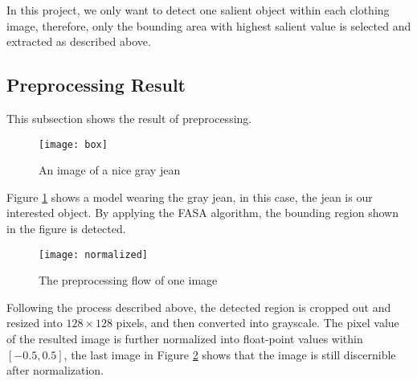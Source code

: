 In this project, we only want to detect one salient object within each clothing image, therefore, only the bounding area with highest salient value is selected and extracted as described above.

\subsection{Preprocessing Result}
This subsection shows the result of preprocessing.
\begin{figure}[h]
  \centering
  \texttt{[image: box]}
  \caption{An image of a nice gray jean}
  \label{fig:sample_image}
\end{figure}

Figure \ref{fig:sample_image} shows a model wearing the gray jean, in this case, the jean is our interested object. By applying the FASA algorithm, the bounding region shown in the figure is detected.

\begin{figure}[h]
  \centering
  \texttt{[image: normalized]}
  \caption{The preprocessing flow of one image}
  \label{fig:normalized}
\end{figure}

Following the process described above, the detected region is cropped out and resized into $128 \times 128$ pixels, and then converted into grayscale. The pixel value of the resulted image is further normalized into float-point values within $[-0.5, 0.5]$, the last image in Figure \ref{fig:normalized} shows that the image is still discernible after normalization.
